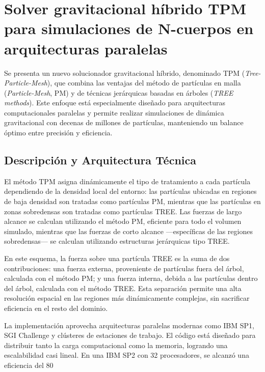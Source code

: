 \section[Solver gravitacional híbrido TPM]{Solver gravitacional híbrido TPM para simulaciones de N-cuerpos en arquitecturas paralelas}

Se presenta un nuevo solucionador gravitacional híbrido, denominado TPM (\textit{Tree-Particle-Mesh}), que combina las ventajas del método de partículas en malla (\textit{Particle-Mesh}, PM) y de técnicas jerárquicas basadas en árboles (\textit{TREE methods}). Este enfoque está especialmente diseñado para arquitecturas computacionales paralelas y permite realizar simulaciones de dinámica gravitacional con decenas de millones de partículas, manteniendo un balance óptimo entre precisión y eficiencia.

\subsection{Descripción y Arquitectura Técnica}

El método TPM asigna dinámicamente el tipo de tratamiento a cada partícula dependiendo de la densidad local del entorno: las partículas ubicadas en regiones de baja densidad son tratadas como partículas PM, mientras que las partículas en zonas sobredensas son tratadas como partículas TREE. Las fuerzas de largo alcance se calculan utilizando el método PM, eficiente para todo el volumen simulado, mientras que las fuerzas de corto alcance —específicas de las regiones sobredensas— se calculan utilizando estructuras jerárquicas tipo TREE.

En este esquema, la fuerza sobre una partícula TREE es la suma de dos contribuciones: una fuerza externa, proveniente de partículas fuera del árbol, calculada con el método PM; y una fuerza interna, debida a las partículas dentro del árbol, calculada con el método TREE. Esta separación permite una alta resolución espacial en las regiones más dinámicamente complejas, sin sacrificar eficiencia en el resto del dominio.

La implementación aprovecha arquitecturas paralelas modernas como IBM SP1, SGI Challenge y clústeres de estaciones de trabajo. El código está diseñado para distribuir tanto la carga computacional como la memoria, logrando una escalabilidad casi lineal. En una IBM SP2 con 32 procesadores, se alcanzó una eficiencia del 80%

